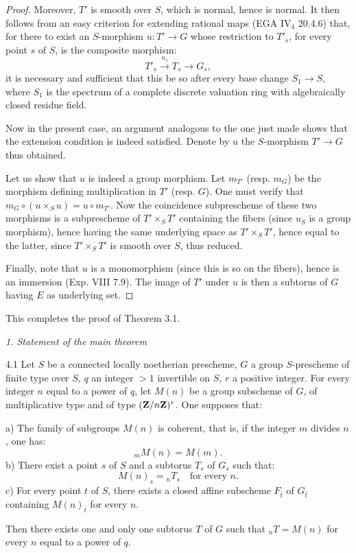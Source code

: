 \begin{proof}
Moreover, $T'$ is smooth over $S$, which is normal, hence is normal. It then follows from an easy criterion for extending rational maps (EGA IV$_4$ 20.4.6) that, for there to exist an $S$-morphism $u:T'\to G$ whose restriction to $T'_s$, for every point $s$ of $S$, is the composite morphism:
\[
T'_s\xrightarrow{u_s}T_s\to G_s,
\]
it is necessary and sufficient that this be so after every base change $S_1\to S$, where $S_1$ is the spectrum of a complete discrete valuation ring with algebraically closed residue field.

Now in the present case, an argument analogous to the one just made shows that the extension condition is indeed satisfied. Denote by $u$ the $S$-morphism $T'\to G$ thus obtained.

Let us show that $u$ is indeed a group morphism. Let $m_{T'}$ (resp. $m_G$) be the morphism defining multiplication in $T'$ (resp. $G$). One must verify that $m_G\circ(u\times_S u)=u\circ m_{T'}$. Now the coincidence subprescheme of these two morphisms is a subprescheme of $T'\times_S T'$ containing the fibers (since $u_S$ is a group morphism), hence having the same underlying space as $T'\times_S T'$, hence equal to the latter, since $T'\times_S T'$ is smooth over $S$, thus reduced.

Finally, note that $u$ is a monomorphism (since this is so on the fibers), hence is an immersion (Exp. VIII 7.9). The image of $T'$ under $u$ is then a subtorus of $G$ having $E$ as underlying set.
\end{proof}
This completes the proof of Theorem 3.1.

\par\medskip\noindent\textit{1. Statement of the main theorem}\par
\begin{theorem}{4.1}\label{XV.4.1}
Let $S$ be a connected locally noetherian prescheme, $G$ a group $S$-prescheme of finite type over $S$, $q$ an integer $>1$ invertible on $S$, $r$ a positive integer. For every integer $n$ equal to a power of $q$, let $M(n)$ be a group subscheme of $G$, of multiplicative type and of type $(\mathbf{Z}/n\mathbf{Z})^r$. One supposes that:

\noindent a) The family of subgroups $M(n)$ is coherent, that is, if the integer $m$ divides $n$, one has:
\[
{}_mM(n)=M(m).
\]
\noindent b) There exist a point $s$ of $S$ and a subtorus $T_s$ of $G_s$ such that:
\[
M(n)_s={}_nT_s\quad\text{for every }n.
\]
\noindent c) For every point $t$ of $S$, there exists a closed affine subscheme $F_{\bar t}$ of $G_{\bar t}$ containing $M(n)_{\bar t}$ for every $n$.

Then there exists one and only one subtorus $T$ of $G$ such that ${}_nT=M(n)$ for every $n$ equal to a power of $q$.
\end{theorem}

